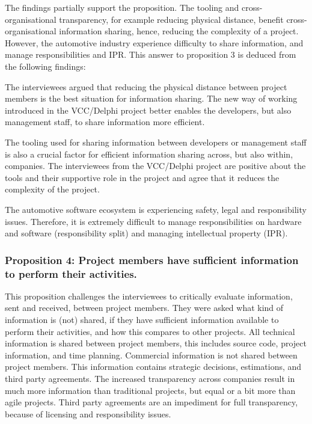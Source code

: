 The findings partially support the proposition. The tooling and cross-organisational transparency, for example reducing physical distance, benefit cross-organisational information sharing, hence, reducing the complexity of a project. However, the automotive industry experience difficulty to share information, and manage responsibilities and IPR. This answer to proposition 3 is deduced from the following findings:

 The interviewees argued that reducing the physical distance between project members is the best situation for information sharing. The new way of working introduced in the VCC/Delphi project better enables the developers, but also management staff, to share information more efficient.

 The tooling used for sharing information between developers or management staff is also a crucial factor for efficient information sharing across, but also within, companies. The interviewees from the VCC/Delphi project are positive about the tools and their supportive role in the project and agree that it reduces the complexity of the project.

 The automotive software ecosystem is experiencing safety, legal and responsibility issues. Therefore, it is extremely difficult to manage responsibilities on hardware and software (responsibility split) and managing intellectual property (IPR). 


\subsubsection{Proposition 4: Project members have sufficient information to perform their activities.}

This proposition challenges the interviewees to critically evaluate information, sent and received, between project members. They were asked what kind of information is (not) shared, if they have sufficient information available to perform their activities, and how this compares to other projects. All technical information is shared between project members, this includes source code, project information, and time planning. Commercial information is not shared between project members. This information contains strategic decisions, estimations, and third party agreements. The increased transparency across companies result in much more information than traditional projects, but equal or a bit more than agile projects. Third party agreements are an impediment for full transparency, because of licensing and responsibility issues.

